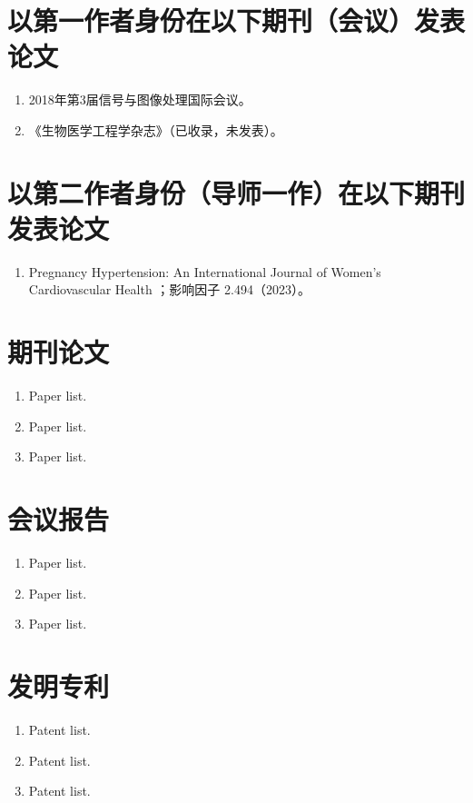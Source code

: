 \cleardoublepage
{}

{%
    \section*{以第一作者身份在以下期刊（会议）发表论文}
    \begin{enumerate}
        \item 2018年第3届信号与图像处理国际会议。
        \item 《生物医学工程学杂志》（已收录，未发表）。
    \end{enumerate}

    \section*{以第二作者身份（导师一作）在以下期刊发表论文}
    \begin{enumerate}
        \item Pregnancy Hypertension: An International Journal of Women's Cardiovascular Health ；影响因子 2.494（2023）。
    \end{enumerate}
}
{%
    \section*{期刊论文}
    \begin{enumerate}
        \item Paper list.
        \item Paper list.
        \item Paper list.
    \end{enumerate}

    \section*{会议报告}
    \begin{enumerate}
        \item Paper list.
        \item Paper list.
        \item Paper list.
    \end{enumerate}

    \section*{发明专利}
    \begin{enumerate}
        \item Patent list.
        \item Patent list.
        \item Patent list.
    \end{enumerate}
}